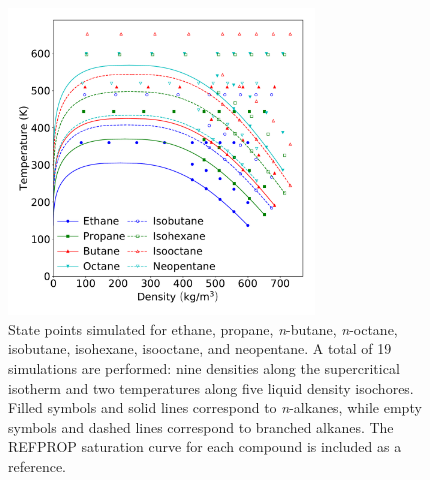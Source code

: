 \documentclass[preprint,letterpaper,floatfix,citeautoscript,aip,jcp]{revtex4-1}
\begin{document}
\begin{figure}[htb!]
	\centering
	\includegraphics[width=3.2in]{simulation_conditions}
	\caption{State points simulated for ethane, propane, \textit{n}-butane, \textit{n}-octane, isobutane, isohexane, isooctane, and neopentane. A total of 19 simulations are performed: nine densities along the supercritical isotherm and two temperatures along five liquid density isochores. Filled symbols and solid lines correspond to \textit{n}-alkanes, while empty symbols and dashed lines correspond to branched alkanes. The REFPROP saturation curve for each compound is included as a reference. \cite{LEMMON-RP91,Ethane2006,Propane2009,Butane2006,Beckmueller2017,Lemmon2006,Blackham2017} }
	\label{fig:simulation_conditions}
\end{figure}

%
\end{document}
